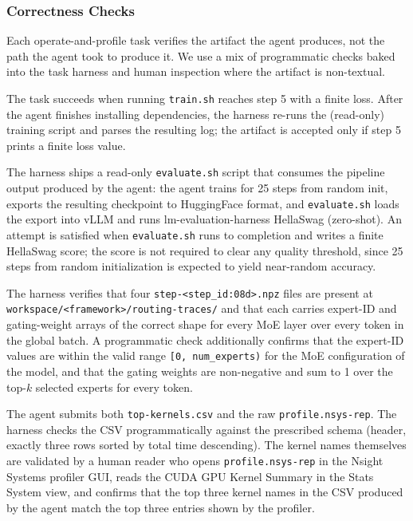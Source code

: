 \subsubsection{Correctness Checks}
\label{sec:appendix:tasks:operate-correctness}

Each operate-and-profile task verifies the artifact the agent
produces, not the path the agent took to produce it. We use a
mix of programmatic checks baked into the task harness and human
inspection where the artifact is non-textual.

The task succeeds when running \texttt{train.sh} reaches step 5
with a finite loss. After the agent finishes installing
dependencies, the harness re-runs the (read-only) training script
and parses the resulting log; the artifact is accepted only if
step 5 prints a finite loss value.

The harness ships a read-only \texttt{evaluate.sh} script that
consumes the pipeline output produced by the agent: the agent
trains for 25
steps from random init, exports the resulting checkpoint to
HuggingFace format, and \texttt{evaluate.sh} loads the export into
vLLM and runs lm-evaluation-harness HellaSwag (zero-shot). An
attempt is satisfied when \texttt{evaluate.sh} runs to completion
and writes a finite HellaSwag score; the score is not required to
clear any quality threshold, since 25 steps from random
initialization is expected to yield near-random accuracy.

The harness verifies that four
\texttt{step-<step\_id:08d>.npz} files are present at
\texttt{workspace/<framework>/routing-traces/} and that each
carries expert-ID and gating-weight arrays of the correct shape
for every MoE layer over every token in the global batch. A
programmatic check additionally confirms that the expert-ID
values are within the valid range \texttt{[0, num\_experts)} for
the MoE configuration of the model, and that the gating weights
are non-negative and sum to 1 over the top-$k$ selected experts
for every token.

The agent submits both \texttt{top-kernels.csv} and the raw
\texttt{profile.nsys-rep}. The harness checks the CSV
programmatically against the prescribed schema (header, exactly
three rows sorted by total time descending). The kernel names
themselves are validated by a human reader who opens
\texttt{profile.nsys-rep} in the Nsight Systems profiler GUI,
reads the CUDA GPU Kernel Summary in the Stats System view, and
confirms that the top three kernel names in the CSV produced by
the agent match the top three entries shown by the profiler.

